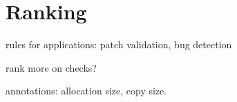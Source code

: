 \section{Ranking}

rules for applications: patch validation, bug detection

rank more on checks?

annotations: allocation size, copy size.
